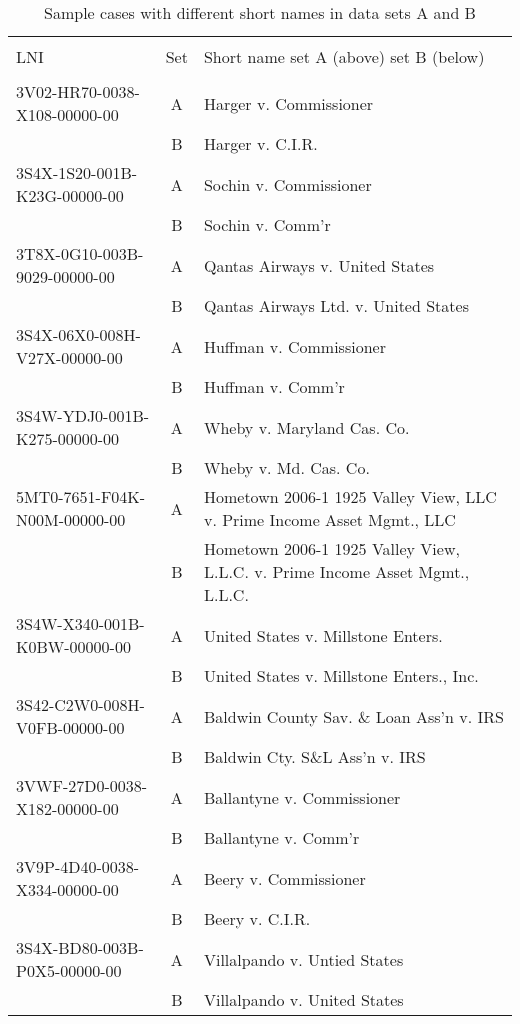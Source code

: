 \documentclass[10pt, letterpaper]{article}
\begin{document}
\begin{spacing}{1.0}
\begin{table}[H]
    \centering
    \caption{Sample cases with different short names in data sets A and B}
    \small
    \begin{tabular}{lcl}
        \hline\\[-6pt]
        LNI & Set & Short name set A (above) set B (below)\\[4pt]
        \hline\\[-6pt]
        3V02-HR70-0038-X108-00000-00 & A & Harger v. Commissioner\\ & B & Harger v. C.I.R.\\[6pt]
        3S4X-1S20-001B-K23G-00000-00 & A & Sochin v. Commissioner\\ & B & Sochin v. Comm'r\\[6pt]
        3T8X-0G10-003B-9029-00000-00 & A & Qantas Airways v. United States\\ & B & Qantas Airways Ltd. v. United States\\[6pt]
        3S4X-06X0-008H-V27X-00000-00 & A & Huffman v. Commissioner\\ & B & Huffman v. Comm'r\\[6pt]
        3S4W-YDJ0-001B-K275-00000-00 & A & Wheby v. Maryland Cas. Co.\\ & B & Wheby v. Md. Cas. Co.\\[6pt]
        5MT0-7651-F04K-N00M-00000-00 & A & Hometown 2006-1 1925 Valley View, LLC v. Prime Income Asset Mgmt., LLC\\ & B & Hometown 2006-1 1925 Valley View, L.L.C. v. Prime Income Asset Mgmt., L.L.C.\\[6pt]
        3S4W-X340-001B-K0BW-00000-00 & A & United States v. Millstone Enters.\\ & B & United States v. Millstone Enters., Inc.\\[6pt]
        3S42-C2W0-008H-V0FB-00000-00 & A & Baldwin County Sav. \& Loan Ass'n v. IRS\\ & B & Baldwin Cty. S\&L Ass'n v. IRS\\[6pt]
        3VWF-27D0-0038-X182-00000-00 & A & Ballantyne v. Commissioner\\ & B & Ballantyne v. Comm'r\\[6pt]
        3V9P-4D40-0038-X334-00000-00 & A & Beery v. Commissioner\\ & B & Beery v. C.I.R.\\[6pt]
        3S4X-BD80-003B-P0X5-00000-00 & A & Villalpando v. Untied States\\ & B & Villalpando v. United States\\[6pt]

\end{tabular}
\end{table}
\end{spacing}
\end{document}
